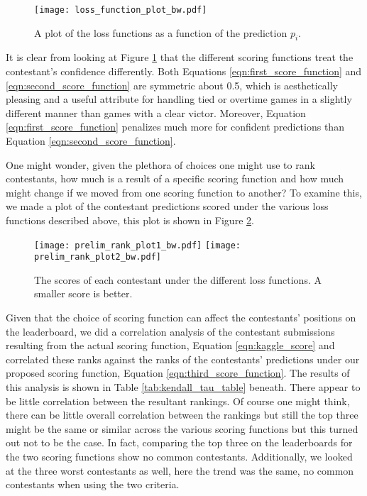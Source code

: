 
\begin{figure}[H]
\centering
\texttt{[image: loss\_function\_plot\_bw.pdf]}
\caption{A plot of the loss functions as a function of the prediction $p_i$.  }
\label{fig:scoring_functions}
\end{figure}

It is clear from looking at Figure \ref{fig:scoring_functions} that the different scoring functions treat the contestant's confidence differently. Both Equations \ref{eqn:first_score_function} and \ref{eqn:second_score_function} are symmetric about 0.5, which is aesthetically pleasing and a useful attribute for handling tied or overtime games in a slightly different manner than games with a clear victor. Moreover, Equation \ref{eqn:first_score_function} penalizes much more for confident predictions than Equation \ref{eqn:second_score_function}. 

One might wonder, given the plethora of choices one might use to rank contestants, how much is a result of a specific scoring function and how much might change if  we moved from one scoring function to another? To examine this, we made a plot of the contestant predictions scored under the various loss functions described above, this plot is shown in Figure \ref{fig:score_rank_plot}. 

  \begin{figure}[h]
\centering
\texttt{[image: prelim\_rank\_plot1\_bw.pdf]}
\texttt{[image: prelim\_rank\_plot2\_bw.pdf]}

\caption{The scores of each contestant under the different loss functions. A smaller score is better.  }
\label{fig:score_rank_plot}
\end{figure}

Given that the choice of scoring function can affect the contestants' positions on the leaderboard, we did a correlation analysis of the contestant submissions resulting from the actual scoring function, Equation \ref{eqn:kaggle_score} and correlated these ranks against the ranks of the contestants'  predictions under our proposed scoring function, Equation \ref{eqn:third_score_function}. The results of this analysis is shown in Table \ref{tab:kendall_tau_table} beneath. There appear to be little correlation between the resultant rankings. Of course one might think, there can be little overall correlation between the rankings but still the top three might be the same or similar across the various scoring functions but this turned out not to be the case. In fact, comparing the top three on the leaderboards for the two scoring functions show no common contestants. Additionally, we looked at the three worst contestants as well, here the trend was the same, no common contestants when using the two criteria. 

